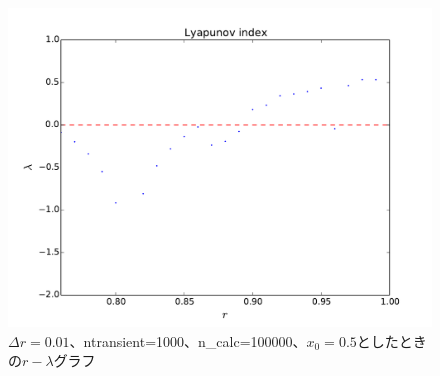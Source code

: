 \documentclass{jsarticle}
\begin{document}
\begin{enumerate}
\begin{enumerate}
                \begin{figure}[H]   
                    \begin{center}
                        \includegraphics[width=12.5cm]{figure_3.pdf}
                        \caption{$\Delta r=0.01$、ntransient=1000、n\_calc=100000、$x_{0}=0.5$としたときの$r - \lambda$グラフ}
                        \label{fig:f9}
                    \end{center}
                \end{figure}
                

\end{enumerate}
\end{enumerate}
\end{document}
